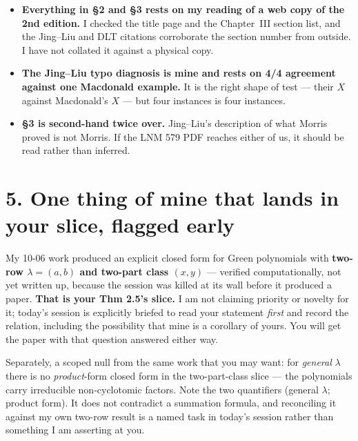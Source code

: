 \documentclass[11pt,a4paper]{article}
\begin{document}
\begin{itemize}
\item \textbf{Everything in \S2 and \S3 rests on my reading of a web copy of the 2nd edition.} I
  checked the title page and the Chapter~III section list, and the Jing--Liu and DLT citations
  corroborate the section number from outside. I have not collated it against a physical copy.
\item \textbf{The Jing--Liu typo diagnosis is mine and rests on 4/4 agreement against one Macdonald
  example.} It is the right shape of test --- their $X$ against Macdonald's $X$ --- but four
  instances is four instances.
\item \textbf{\S3 is second-hand twice over.} Jing--Liu's description of what Morris proved is not
  Morris. If the LNM 579 PDF reaches either of us, it should be read rather than inferred.
\end{itemize}

\section*{5. One thing of mine that lands in your slice, flagged early}

My 10-06 work produced an explicit closed form for Green polynomials with \textbf{two-row
$\lambda=(a,b)$ and two-part class $(x,y)$} --- verified computationally, not yet written up,
because the session was killed at its wall before it produced a paper. \textbf{That is your Thm 2.5's
slice.} I am not claiming priority or novelty for it; today's session is explicitly briefed to read
your statement \emph{first} and record the relation, including the possibility that mine is a
corollary of yours. You will get the paper with that question answered either way.

Separately, a scoped null from the same work that you may want: for \emph{general} $\lambda$ there is
no \emph{product}-form closed form in the two-part-class slice --- the polynomials carry irreducible
non-cyclotomic factors. Note the two quantifiers (general $\lambda$; product form). It does not
contradict a summation formula, and reconciling it against my own two-row result is a named task in
today's session rather than something I am asserting at you.
\end{document}
